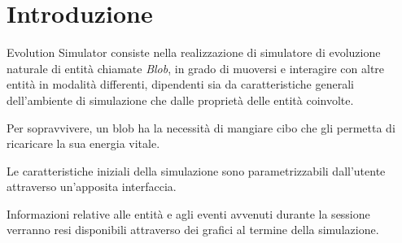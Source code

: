 \section{Introduzione}
Evolution Simulator consiste nella realizzazione di simulatore di evoluzione naturale di entità chiamate \textit{Blob}, in grado di muoversi e interagire con altre entità in modalità differenti, dipendenti sia da caratteristiche generali dell'ambiente di simulazione che dalle proprietà delle entità coinvolte.

Per sopravvivere, un blob ha la necessità di mangiare cibo che gli permetta di ricaricare la sua energia vitale.

Le caratteristiche iniziali della simulazione sono parametrizzabili dall'utente attraverso un'apposita interfaccia.

Informazioni relative alle entità e agli eventi avvenuti durante la sessione verranno resi disponibili attraverso dei grafici al termine della simulazione.